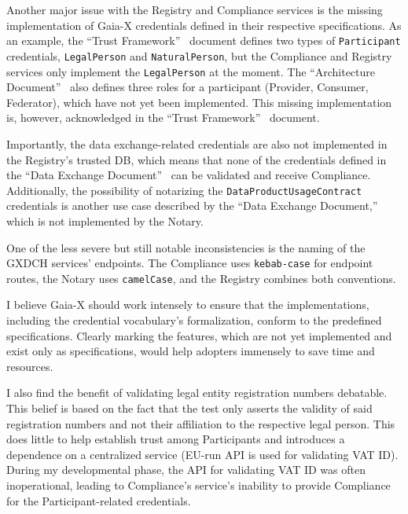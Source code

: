 Another major issue with the Registry and Compliance services is the missing implementation of Gaia-X credentials defined in their respective specifications.
As an example, the ``Trust Framework''~\cite{gaiax_trust_framework} document defines two types of \texttt{Participant} credentials, \texttt{LegalPerson} and \texttt{NaturalPerson}, but the Compliance and Registry services only implement the \texttt{LegalPerson} at the moment.
The ``Architecture Document''~\cite{gaiax_architecture_document} also defines three roles for a participant (Provider, Consumer, Federator), which have not yet been implemented.
This missing implementation is, however, acknowledged in the ``Trust Framework''~\cite{gaiax_trust_framework} document.

Importantly, the data exchange-related credentials are also not implemented in the Registry's trusted DB, which means that none of the credentials defined in the ``Data Exchange Document''~\cite{gaiax_data_exchange_document} can be validated and receive Compliance.
Additionally, the possibility of notarizing the \texttt{DataProductUsageContract} credentials is another use case described by the ``Data Exchange Document,''~\cite{gaiax_data_exchange_document} which is not implemented by the Notary.

One of the less severe but still notable inconsistencies is the naming of the GXDCH services' endpoints.
The Compliance uses \texttt{kebab-case} for endpoint routes, the Notary uses \texttt{camelCase}, and the Registry combines both conventions.

I believe Gaia-X should work intensely to ensure that the implementations, including the credential vocabulary's formalization, conform to the predefined specifications.
Clearly marking the features, which are not yet implemented and exist only as specifications, would help adopters immensely to save time and resources.

I also find the benefit of validating legal entity registration numbers debatable.
This belief is based on the fact that the test only asserts the validity of said registration numbers and not their affiliation to the respective legal person.
This does little to help establish trust among Participants and introduces a dependence on a centralized service (EU-run API is used for validating VAT ID). During my developmental phase, the API for validating VAT ID was often inoperational, leading to Compliance's service's inability to provide Compliance for the Participant-related credentials.


